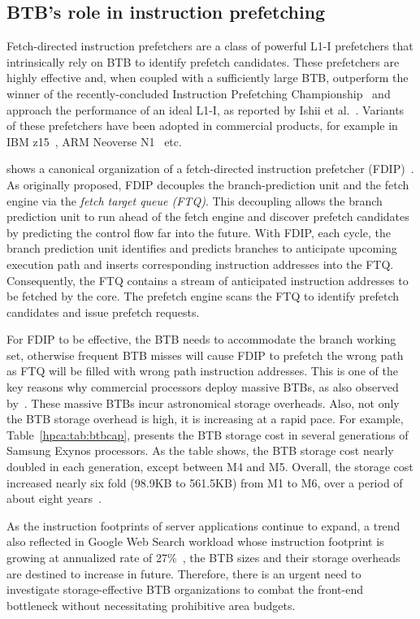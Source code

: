 \subsection{BTB's role in instruction prefetching}
Fetch-directed instruction prefetchers are a class of powerful L1-I prefetchers that intrinsically rely on BTB to identify prefetch candidates. 
These prefetchers are highly effective and, when coupled with a sufficiently large BTB, outperform the winner of the recently-concluded Instruction Prefetching Championship~\cite{ipc1} and approach the performance of an ideal L1-I, as reported by Ishii et al.~\cite{rebase}. Variants of these prefetchers have been adopted in commercial products, for example in IBM z15~\cite{IBMz15HotChips}, ARM Neoverse N1~\cite{neoverse} etc.

 shows a canonical organization of a fetch-directed instruction prefetcher (FDIP)~\cite{fdip}. 
As originally proposed, FDIP decouples the branch-prediction unit and the fetch engine via the {\em fetch target queue (FTQ)}. This decoupling allows the branch prediction unit to run ahead of the fetch engine and discover prefetch candidates by predicting the control flow far into the future. With FDIP, each cycle, the branch prediction unit identifies and predicts branches to anticipate upcoming execution path and inserts corresponding instruction addresses into the FTQ. Consequently, the FTQ contains a stream of anticipated instruction addresses to be fetched by the core. The prefetch engine scans the FTQ to identify prefetch candidates and issue prefetch requests. 

For FDIP to be effective, the BTB needs to accommodate the branch working set, otherwise frequent BTB misses will cause FDIP to prefetch the wrong path as FTQ will be filled with wrong path instruction addresses. This is one of the key reasons why commercial processors deploy massive BTBs, as also observed by~\cite{rebase}. These massive BTBs incur astronomical storage overheads. Also, not only the BTB storage overhead is high, it is increasing at a rapid pace. For example, Table~\ref{hpca:tab:btbcap}, presents the BTB storage cost in several generations of Samsung Exynos processors. As the table shows, the BTB storage cost nearly doubled in each generation, except between M4 and M5. Overall, the storage cost increased nearly six fold (98.9KB to 561.5KB) from M1 to M6, over a period of about eight years~\cite{exynos}.

As the instruction footprints of server applications continue to expand, a trend also reflected in Google Web Search workload whose instruction footprint is growing at annualized rate of 27\%~\cite{profileWarehouse}, the BTB sizes and their storage overheads are destined to increase in future. Therefore, there is an urgent need to investigate storage-effective BTB organizations to combat the front-end bottleneck without necessitating prohibitive area budgets.

